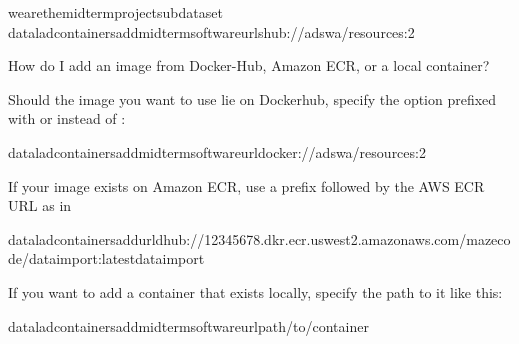 \begin{sphinxVerbatim}[commandchars=\\\{\}]
wearethemidterm\PYGZus{}projectsubdataset
dataladcontainers\PYGZhy{}addmidterm\PYGZhy{}software\PYGZhy{}\PYGZhy{}urlshub://adswa/resources:2
\end{sphinxVerbatim}

\ignorespaces \begin{findoutmore}[label={index-5}, before title={\thetcbcounter\ }, check odd page=true]{How do I add an image from Docker-Hub, Amazon ECR, or a local container?}
\label{\detokenize{basics/101-133-containersrun:index-5}}

\sphinxAtStartPar
Should the image you want to use lie on Dockerhub, specify the 
option prefixed with  or  instead of :

\begin{sphinxVerbatim}[commandchars=\\\{\}]
dataladcontainers\PYGZhy{}addmidterm\PYGZhy{}software\PYGZhy{}\PYGZhy{}urldocker://adswa/resources:2
\end{sphinxVerbatim}

\sphinxAtStartPar
If your image exists on Amazon ECR, use a  prefix followed by the AWS ECR URL as in

\begin{sphinxVerbatim}[commandchars=\\\{\}]
dataladcontainers\PYGZhy{}add\PYGZhy{}\PYGZhy{}urldhub://12345678.dkr.ecr.us\PYGZhy{}west\PYGZhy{}2.amazonaws.com/maze\PYGZhy{}code/data\PYGZhy{}import:latestdata\PYGZhy{}import
\end{sphinxVerbatim}

\sphinxAtStartPar
If you want to add a container that exists locally, specify the path to it
like this:

\begin{sphinxVerbatim}[commandchars=\\\{\}]
dataladcontainers\PYGZhy{}addmidterm\PYGZhy{}software\PYGZhy{}\PYGZhy{}urlpath/to/container
\end{sphinxVerbatim}


\end{findoutmore}

